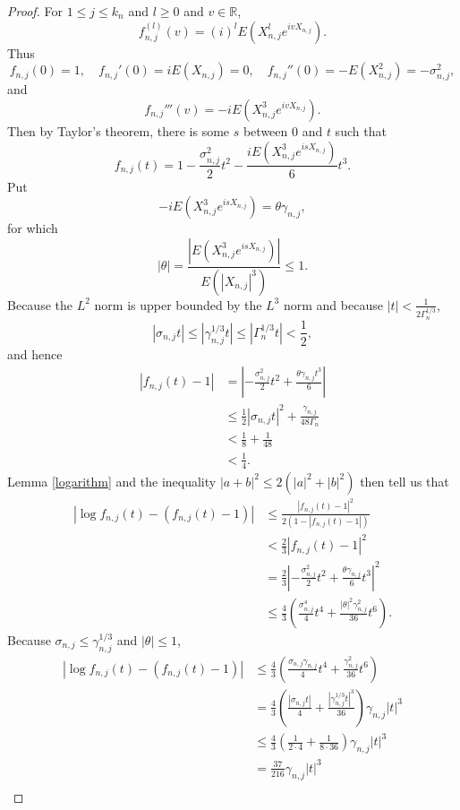 \documentclass{article}
\theoremstyle{definition}
\theoremstyle{definition}
\begin{document}
\begin{proof}
For $1 \leq j \leq k_n$ and $l \geq 0$ and $v \in \mathbb{R}$,
\[
f_{n,j}^{(l)}(v) = (i)^l E(X_{n,j}^l e^{ivX_{n,j}}).
\]
Thus
\[
f_{n,j}(0) = 1, \quad f_{n,j}'(0) = iE(X_{n,j})=0, \quad  f_{n,j}''(0) = -E(X_{n,j}^2) = - \sigma_{n,j}^2,
\]
and
\[
f_{n,j}'''(v)=-iE(X_{n,j}^3 e^{ivX_{n,j}}).
\]
Then by Taylor's theorem, there is some $s$ between $0$ and $t$ such that
\[
f_{n,j}(t) = 1 -\frac{\sigma_{n,j}^2}{2} t^2 -\frac{iE(X_{n,j}^3 e^{isX_{n,j}})}{6} t^3.
\]
Put
\[
-iE(X_{n,j}^3 e^{isX_{n,j}})=\theta \gamma_{n,j},
\]
for which
\[
|\theta| = \frac{|E(X_{n,j}^3 e^{isX_{n,j}})|}{E(|X_{n,j}|^3)}
\leq 1.
\]
Because
the $L^2$ norm is upper bounded by the $L^3$ norm and because
 $|t| < \frac{1}{2\Gamma_n^{1/3}}$,
\[
|\sigma_{n,j} t| \leq |\gamma_{n,j}^{1/3} t| \leq |\Gamma_n^{1/3} t| < \frac{1}{2},
\]
and hence
\begin{align*}
|f_{n,j}(t)-1|&=\left|-\frac{\sigma_{n,j}^2}{2}t^2 + \frac{\theta \gamma_{n,j} t^3}{6} \right|\\
&\leq \frac{1}{2} |\sigma_{n,j} t|^2
+ \frac{\gamma_{n,j}}{48 \Gamma_n}\\
&< \frac{1}{8}+ \frac{1}{48}\\
&<\frac{1}{4}.
\end{align*}
Lemma \ref{logarithm} and the inequality 
$|a+b|^2 \leq 2(|a|^2+|b|^2)$
then tell us that  
\begin{align*}
\left|\log f_{n,j}(t) - (f_{n,j}(t)-1)\right| &\leq \frac{|f_{n,j}(t)-1|^2}{2(1-|f_{n,j}(t)-1|)}\\
&<\frac{2}{3} |f_{n,j}(t)-1|^2\\
&= \frac{2}{3} \left| -\frac{\sigma_{n,j}^2}{2}t^2+\frac{\theta \gamma_{n,j}}{6} t^3 \right|^2\\
&\leq \frac{4}{3}\left( \frac{\sigma_{n,j}^4}{4}t^4 + \frac{|\theta|^2 \gamma_{n,j}^2}{36}t^6\right).
\end{align*}
Because $\sigma_{n,j} \leq \gamma_{n,j}^{1/3}$ and $|\theta| \leq 1$,
\begin{align*}
\left|\log f_{n,j}(t) - (f_{n,j}(t)-1)\right| &\leq \frac{4}{3} \left( \frac{\sigma_{n,j} \gamma_{n,j}}{4} t^4 
+\frac{\gamma_{n,j}^2}{36} t^6\right)\\
&=\frac{4}{3}\left( \frac{|\sigma_{n,j} t|}{4} + \frac{|\gamma_{n,j}^{1/3} t|^3}{36} \right) \gamma_{n,j} |t|^3\\
&\leq \frac{4}{3}\left(\frac{1}{2\cdot 4}+\frac{1}{8\cdot 36}\right) \gamma_{n,j} |t|^3\\
&=\frac{37}{216} \gamma_{n,j} |t|^3\\

\end{align*}
\end{proof}
\end{document}
